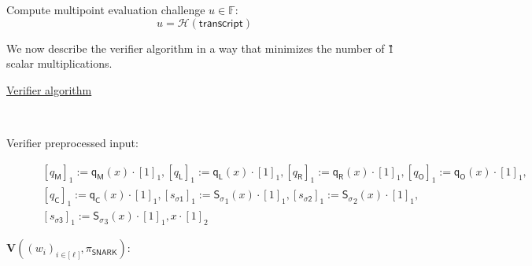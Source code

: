 \documentclass[11pt]{article} %
\newcommand{\F}{\ensuremath{\mathbb F}\xspace}
\newcommand{\hash}{\ensuremath{\mathcal{H}}\xspace}
\newcommand{\ver}{\ensuremath{\mathsf{\mathbf{V}}}\xspace}
\newcommand{\sigpoly}{\ensuremath{\mathsf{S_{\sigma}}}\xspace}
\newcommand{\selmultpoly}{\ensuremath{\mathsf{q_M}}\xspace}
\newcommand{\selleftpoly}{\ensuremath{\mathsf{q_L}}\xspace}
\newcommand{\selrightpoly}{\ensuremath{\mathsf{q_R}}\xspace}
\newcommand{\seloutpoly}{\ensuremath{\mathsf{q_O}}\xspace}
\newcommand{\selconstpoly}{\ensuremath{\mathsf{q_C}}\xspace}
\newcommand{\sigcomma}{\ensuremath{[s_{\mathsf{\sigma1}}]_1}\xspace}
\newcommand{\sigcommb}{\ensuremath{[s_{\mathsf{\sigma2}}]_1}\xspace}
\newcommand{\sigcommc}{\ensuremath{[s_{\mathsf{\sigma3}}]_1}\xspace}
\newcommand{\selleftcomm}{\ensuremath{[q_\mathsf{L}]_1}\xspace}
\newcommand{\selrightcomm}{\ensuremath{[q_\mathsf{R}]_1}\xspace}
\newcommand{\seloutcomm}{\ensuremath{[q_\mathsf{O}]_1}\xspace}
\newcommand{\selconstcomm}{\ensuremath{[q_\mathsf{C}]_1}\xspace}
\newcommand{\selmultcomm}{\ensuremath{[q_\mathsf{M}]_1}\xspace}
\newcommand{\snark}{\ensuremath{\mathsf{snark}}\xspace}
\newcommand{\Verify}{\mathcal{V}}
\newcommand{\Vsnark}{\ver}%
\newcommand{\transcript}{\ensuremath{\mathsf{transcript}}\xspace}
\begin{document}
	Compute multipoint evaluation challenge $u \in \F:$
	$$
	u = \hash(\transcript)
	$$

	We now describe the verifier algorithm in a way that minimizes the number of \G1 scalar multiplications.
	\begin{description}
	\item[\underline{Verifier algorithm}] \ \\
	\item[Verifier preprocessed input:] 
	$$
	\begin{array}{l}
 \selmultcomm := \selmultpoly(x) \cdot [1]_1, \selleftcomm := \selleftpoly(x) \cdot [1]_1, \selrightcomm := \selrightpoly(x) \cdot [1]_1, \seloutcomm := \seloutpoly(x) \cdot [1]_1, \\
 \selconstcomm := \selconstpoly(x) \cdot [1]_1, \sigcomma := \sigpoly_1(x) \cdot [1]_1, \sigcommb := \sigpoly_2(x) \cdot [1]_1,\\
 \sigcommc := \sigpoly_3(x)\cdot [1]_1, x \cdot [1]_2
	\end{array}
	$$
	\item[$\Vsnark((w_i)_{i \in {[}\ell{]}}, \pi_{\mathsf{SNARK}})$:] \ \\
\end{description}
\noindent
\end{document}
